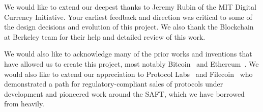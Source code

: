 \documentclass[letterpaper,11pt]{article}
\begin{document}
We would like to extend our deepest thanks to Jeremy Rubin of the MIT Digital Currency Initiative. Your earliest feedback and direction was critical to some of the design decisions and evolution of this project. We also thank the Blockchain at Berkeley team for their help and detailed review of this work.\newline

We would also like to acknowledge many of the prior works and inventions that have allowed us to create this project, most notably Bitcoin~\cite{bitcoin} and Ethereum~\cite{ethereum}. We would also like to extend our appreciation to Protocol Labs~\cite{protocol} and Filecoin~\cite{filecoin} who demonstrated a path for regulatory-compliant sales of protocols under development and pioneered work around the SAFT, which we have borrowed from heavily.
\newpage
\end{document}

